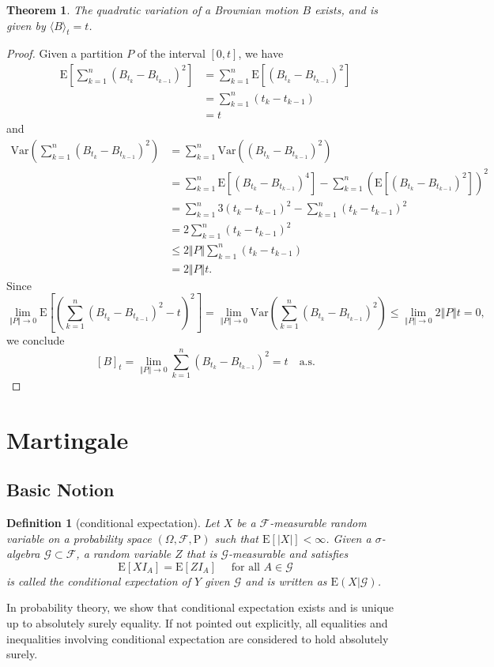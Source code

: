 \documentclass{article}
\newtheorem{definition}{Definition}[section]
\newtheorem{theorem}{Theorem}[section]
\theoremstyle{nonumberplain}
\newtheorem{proof}{Proof.}
\begin{document}
\begin{theorem}
	The quadratic variation of a Brownian motion $B$ exists, and is given by $\langle B\rangle_{t}= t$. 
\end{theorem}
\begin{proof} 
	Given a partition $P$ of the interval $[0,t]$, we have
	\[
	\begin{aligned}
	\mathrm{E}\left[\sum _{k=1}^{n}(B_{t_{k}}-B_{t_{k-1}})^{2}\right]&=\sum _{k=1}^{n}\mathrm{E}\left[(B_{t_{k}}-B_{t_{k-1}})^{2}\right]\\
	&=\sum _{k=1}^{n}(t_{k}-t_{k-1})\\
	&=t
	\end{aligned}
	\]
	and
	\[
	\begin{aligned}
	\mathrm{Var}\left(\sum _{k=1}^{n}(B_{t_{k}}-B_{t_{k-1}})^{2}\right)&=\sum _{k=1}^{n}\mathrm{Var}\left((B_{t_{k}}-B_{t_{k-1}})^{2}\right)\\
	&=\sum _{k=1}^{n}\mathrm{E}\left[(B_{t_{k}}-B_{t_{k-1}})^{4}\right]-\sum _{k=1}^{n}\left(\mathrm{E}\left[\left(B_{t_{k}}-B_{t_{k-1}}\right)^{2}\right]\right)^{2}\\
	&=\sum_{k=1}^{n}3(t_{k}-t_{k-1})^2-\sum _{k=1}^{n}\left(t_{k}-t_{k-1}\right)^{2}\\
	&=2\sum_{k=1}^{n}(t_{k}-t_{k-1})^2\\
	&\le 2\Vert P\Vert\sum_{k=1}^{n}(t_{k}-t_{k-1})\\
	&= 2\Vert P\Vert t.
	\end{aligned}
	\]
	Since
	\[
	\lim\limits_{\Vert P\Vert\to0 }\mathrm{E}\left[\left(\sum _{k=1}^{n}(B_{t_{k}}-B_{t_{k-1}})^{2}-t\right)^2\right]=\lim\limits_{\Vert P\Vert \to0}\mathrm{Var}\left(\sum _{k=1}^{n}(B_{t_{k}}-B_{t_{k-1}})^{2}\right)\le \lim\limits_{\Vert P\Vert\to0 }2\Vert P\Vert t=0,
	\]
	we conclude 
	\[
	[B]_t=\lim_{\Vert P\Vert \rightarrow 0}\sum _{k=1}^{n}(B_{t_{k}}-B_{t_{k-1}})^{2}=t\quad\text{a.s.}
	\]
\end{proof}



\section{Martingale}
\subsection{Basic Notion}
\begin{definition}[conditional expectation]
	Let $X$ be a $\mathcal{F}$-measurable random variable on a probability space $(\Omega,\mathcal{F},\mathrm{P})$ such that $\mathrm{E}[\left|X\right|] < \infty$. Given a $\sigma$-algebra $\mathcal{G}\subset\mathcal{F}$, a random variable $Z$ that is $\mathcal{G}$-measurable and satisfies 
	\[
	\mathrm{E}[X I_A] = \mathrm{E}[ZI_A] \quad\text{ for all }A \in \mathcal{G}
	\] 
	is called the \emph{conditional expectation} of $Y$ given $\mathcal{G}$ and is written as $\mathrm{E}(X|\mathcal{G})$.
\end{definition}
In probability theory, we show that conditional expectation exists and is unique up to absolutely surely equality. If not pointed out explicitly, all equalities and inequalities involving conditional expectation are considered to hold absolutely surely. 
\end{document}
